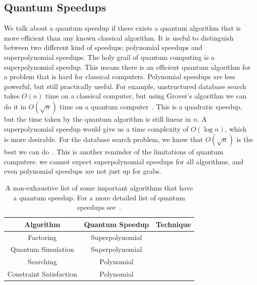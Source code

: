 \documentclass[twocolumn, switch]{article}
\begin{document}
    \subsection{Quantum Speedups}
    We talk about a quantum speedup if there exists a quantum algorithm that is more efficient than any known classical algorithm.
    It is useful to distinguish between two different kind of speedups: polynomial speedups and superpolynomial speedups.
    The holy grail of quantum computing is a superpolynomial speedup.
    This means there is an efficient quantum algorithm for a problem that is hard for classical computers.
    Polynomial speedups are less powerful, but still practically useful.
    For example, unstructured database search takes $O(n)$ time on a classical computer, but using Grover's algorithm we can do it in $O(\sqrt{n})$ time on a quantum computer~\cite{grover1996fast}.
    This is a quadratic speedup, but the time taken by the quantum algorithm is still linear in $n$.
    A superpolynomial speedup would give us a time complexity of $O(\log{n})$, which is more desirable.
    For the database search problem, we know that $O(\sqrt{n})$ is the best we can do~\cite{bennett1997strengths}.
    This is another reminder of the limitations of quantum computers: we cannot expect superpolynomial speedups for all algorithms, and even polynomial speedups are not just up for grabs.
    
    \begin{table}[ht]
        {\renewcommand{\arraystretch}{1.2}
            \begin{tabularx}{\columnwidth}{c|c|Y}
                \hline
                Algorithm & Quantum Speedup & Technique \\
                \hline
                Factoring & Superpolynomial & \cite{shor-factoring} \\
                Quantum Simulation & Superpolynomial &
                \cite{zalka1998efficient, lloyd1996universal, aspuru2005simulated} \\
                Searching & Polynomial & \cite{grover1996fast} \\
                Constraint Satisfaction & Polynomial & \cite{ambainis2005quantum} \\
                 \hline
            \end{tabularx}
        }
        \caption{A non-exhaustive list of some important algorithms that have a quantum speedup. For a more detailed list of quantum speedups see~\cite{jordan2011quantum}.}
        \label{table:quantum-classic-efficiency}
    \end{table}
\end{document}
